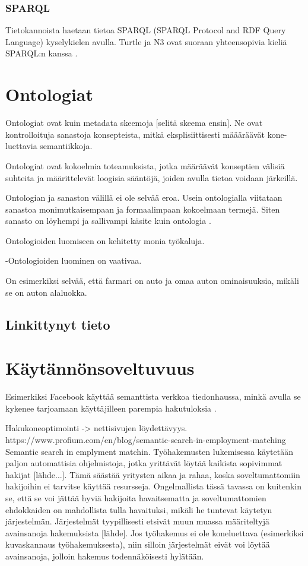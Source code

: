\documentclass[finnish, 12pt, a4paper, elec, utf8, pdfa, online]{aaltothesis}
\begin{document}
\subsubsection{SPARQL}
Tietokannoista haetaan tietoa SPARQL (SPARQL Protocol and RDF Query Language) kyselykielen avulla. Turtle ja N3 ovat suoraan yhteensopivia kieliä SPARQL:n kanssa \cite{W3C_turtle}.

\clearpage
\section{Ontologiat}
Ontologiat ovat kuin metadata skeemoja [selitä skeema ensin].
Ne ovat kontrolloituja sanastoja konsepteista, mitkä eksplisiittisesti määäräävät kone-luettavia semantiikkoja.
\cite{ontology_learning}

Ontologiat ovat kokoelmia toteamuksista, jotka määräävät konseptien välisiä suhteita ja määrittelevät loogisia sääntöjä, joiden avulla tietoa voidaan järkeillä. \cite{Berners_visio}


Ontologian ja sanaston välillä ei ole selvää eroa. Usein ontologialla viitataan sanastoa monimutkaisempaan ja formaalimpaan kokoelmaan termejä. Siten sanasto on löyhempi ja sallivampi käsite kuin ontologia \cite{vocabulary}.


Ontologioiden luomiseen on kehitetty monia työkaluja.

-Ontologioiden luominen on vaativaa.

On esimerkiksi selvää, että farmari on auto ja omaa auton ominaisuuksia, mikäli se on auton alaluokka.


\subsection{Linkittynyt tieto}

\clearpage
\section{Käytännönsoveltuvuus}
Esimerkiksi Facebook käyttää semanttista verkkoa tiedonhaussa, minkä avulla se kykenee tarjoamaan käyttäjilleen parempia hakutuloksia \cite{Facebook}.

Hakukoneoptimointi -> nettisivujen löydettävyys.
https://www.profium.com/en/blog/semantic-search-in-employment-matching
Semantic search in emplyment matchin.
Työhakemusten lukemisessa käytetään paljon automattisia ohjelmistoja, jotka yrittävät löytää kaikista sopivimmat hakijat [lähde...]. Tämä säästää yritysten aikaa ja rahaa, koska soveltumattomiin hakijoihin ei tarvitse käyttää resursseja. Ongelmallista tässä tavassa on kuitenkin se, että se voi jättää hyviä hakijoita havaitsematta ja soveltumattomien ehdokkaiden on mahdollista tulla havaituksi, mikäli he tuntevat käytetyn järjestelmän. Järjestelmät tyypillisesti etsivät muun muassa määriteltyjä avainsanoja hakemuksista [lähde]. Jos työhakemus ei ole koneluettava (esimerkiksi kuvaskannaus työhakemuksesta), niin silloin järjestelmät eivät voi löytää avainsanoja, jolloin hakemus todennäköisesti hylätään.
\end{document}
